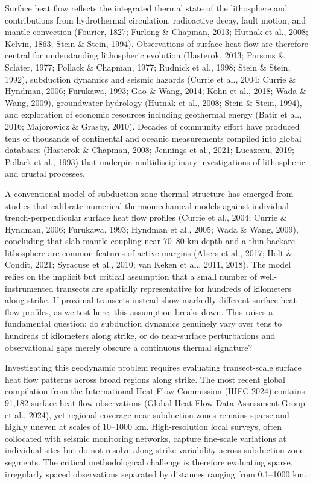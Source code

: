\documentclass[draft,linenumbers]{agujournal2019}
\begin{document}
Surface heat flow reflects the integrated thermal state of the
lithosphere and contributions from hydrothermal circulation, radioactive
decay, fault motion, and mantle convection (Fourier, 1827; Furlong \&
Chapman, 2013; Hutnak et al., 2008; Kelvin, 1863; Stein \& Stein, 1994).
Observations of surface heat flow are therefore central for
understanding lithospheric evolution (Hasterok, 2013; Parsons \&
Sclater, 1977; Pollack \& Chapman, 1977; Rudnick et al., 1998; Stein \&
Stein, 1992), subduction dynamics and seismic hazards (Currie et al.,
2004; Currie \& Hyndman, 2006; Furukawa, 1993; Gao \& Wang, 2014; Kohn
et al., 2018; Wada \& Wang, 2009), groundwater hydrology (Hutnak et al.,
2008; Stein \& Stein, 1994), and exploration of economic resources
including geothermal energy (Batir et al., 2016; Majorowicz \& Grasby,
2010). Decades of community effort have produced tens of thousands of
continental and oceanic measurements compiled into global databases
(Hasterok \& Chapman, 2008; Jennings et al., 2021; Lucazeau, 2019;
Pollack et al., 1993) that underpin multidisciplinary investigations of
lithospheric and crustal processes.

A conventional model of subduction zone thermal structure has emerged
from studies that calibrate numerical thermomechanical models against
individual trench-perpendicular surface heat flow profiles (Currie et
al., 2004; Currie \& Hyndman, 2006; Furukawa, 1993; Hyndman et al.,
2005; Wada \& Wang, 2009), concluding that slab-mantle coupling near
70--80 km depth and a thin backarc lithosphere are common features of
active margins ({Abers et al.}, 2017; Holt \& Condit, 2021; {Syracuse et
al.}, 2010; {van Keken et al.}, 2011, 2018). The model relies on the
implicit but critical assumption that a small number of
well-instrumented transects are spatially representative for hundreds of
kilometers along strike. If proximal transects instead show markedly
different surface heat flow profiles, as we test here, this assumption
breaks down. This raises a fundamental question: do subduction dynamics
genuinely vary over tens to hundreds of kilometers along strike, or do
near-surface perturbations and observational gaps merely obscure a
continuous thermal signature?

Investigating this geodynamic problem requires evaluating transect-scale
surface heat flow patterns across broad regions along strike. The most
recent global compilation from the International Heat Flow Commission
(IHFC 2024) contains 91,182 surface heat flow observations (Global Heat
Flow Data Assessment Group et al., 2024), yet regional coverage near
subduction zones remains sparse and highly uneven at scales of 10--1000
km. High-resolution local surveys, often collocated with seismic
monitoring networks, capture fine-scale variations at individual sites
but do not resolve along-strike variability across subduction zone
segments. The critical methodological challenge is therefore evaluating
sparse, irregularly spaced observations separated by distances ranging
from 0.1--1000 km.
\end{document}
